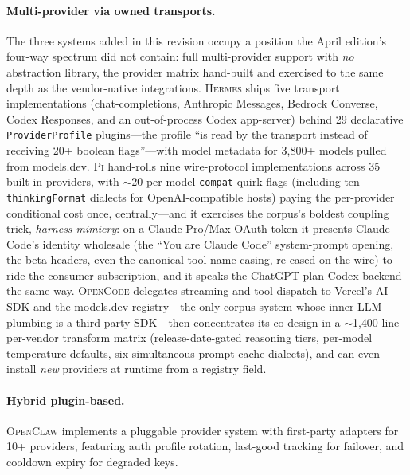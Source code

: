 \documentclass[11pt,a4paper]{article}
\newcommand{\ocl}{\textsc{OpenClaw}\xspace}
\newcommand{\hrm}{\textsc{Hermes}\xspace}
\newcommand{\pib}{\textsc{Pi}\xspace}
\newcommand{\ocd}{\textsc{OpenCode}\xspace}
\begin{document}
\paragraph{Multi-provider via owned transports.}
The three systems added in this revision occupy a position the April edition's four-way spectrum did not contain: full multi-provider support with \emph{no} abstraction library, the provider matrix hand-built and exercised to the same depth as the vendor-native integrations.
\hrm{} ships five transport implementations (chat-completions, Anthropic Messages, Bedrock Converse, Codex Responses, and an out-of-process Codex app-server) behind 29 declarative \texttt{ProviderProfile} plugins---the profile ``is read by the transport instead of receiving 20+ boolean flags''---with model metadata for 3{,}800+ models pulled from models.dev.
\pib{} hand-rolls nine wire-protocol implementations across 35 built-in providers, with $\sim$20 per-model \texttt{compat} quirk flags (including ten \texttt{thinkingFormat} dialects for OpenAI-compatible hosts) paying the per-provider conditional cost once, centrally---and it exercises the corpus's boldest coupling trick, \emph{harness mimicry}: on a Claude Pro/Max OAuth token it presents Claude Code's identity wholesale (the ``You are Claude Code'' system-prompt opening, the beta headers, even the canonical tool-name casing, re-cased on the wire) to ride the consumer subscription, and it speaks the ChatGPT-plan Codex backend the same way.
\ocd{} delegates streaming and tool dispatch to Vercel's AI SDK and the models.dev registry---the only corpus system whose inner LLM plumbing is a third-party SDK---then concentrates its co-design in a $\sim$1{,}400-line per-vendor transform matrix (release-date-gated reasoning tiers, per-model temperature defaults, six simultaneous prompt-cache dialects), and can even install \emph{new} providers at runtime from a registry field.

\paragraph{Hybrid plugin-based.}
\ocl{} implements a pluggable provider system with first-party adapters for 10+ providers, featuring auth profile rotation, last-good tracking for failover, and cooldown expiry for degraded keys.
\end{document}
